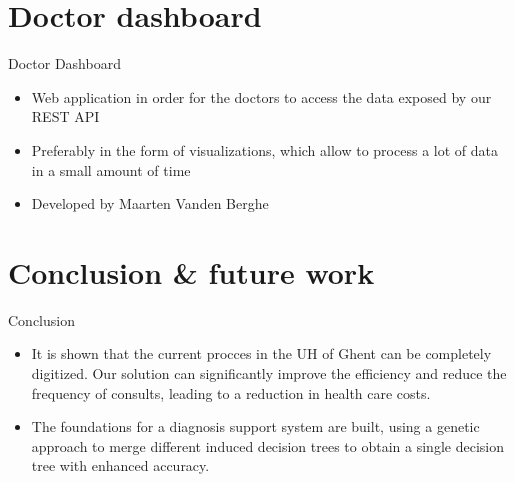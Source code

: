 \documentclass[english]{beamer}
\begin{document}
\section{Doctor dashboard}
\begin{frame}{Doctor Dashboard}
	\begin{itemize}
		\item Web application in order for the doctors to access the data exposed by our REST API \\
		\item Preferably in the form of visualizations, which allow to process a lot of data in a small amount of time
		\item Developed by Maarten Vanden Berghe
	\end{itemize}
%	
%	
%	
\end{frame}
\section{Conclusion \& future work}







\begin{frame}{Conclusion}
	\begin{itemize}
		\item It is shown that the current procces in the UH of Ghent can be completely digitized. Our solution can significantly improve the efficiency and reduce the frequency of consults, leading to a reduction
		in health care costs. \vspace{2em}
		\item The foundations for a diagnosis support system are built, using a genetic approach to merge different induced decision trees to obtain a single decision tree with enhanced accuracy.
	\end{itemize}
\end{frame}
\end{document}
